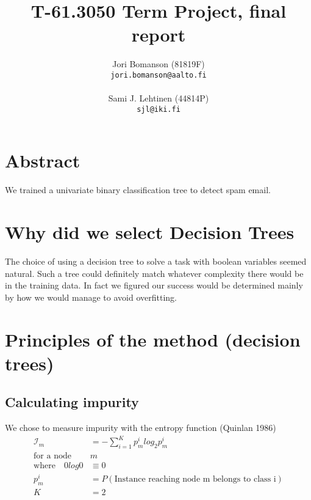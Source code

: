 \documentclass[a4paper,10pt]{article}
\title{T-61.3050 Term Project, final report} %
\author{Jori Bomanson (81819F) \\
  {\tt jori.bomanson@aalto.fi} \\
  \\
  Sami J. Lehtinen (44814P)\\ 
  {\tt sjl@iki.fi} \\
}
\begin{document}

\maketitle

\section*{Abstract}
We trained a univariate binary classification tree to detect spam email.


\section*{}

\section*{Why did we select Decision Trees}

The choice of using a decision tree to solve a task with boolean variables
seemed natural. Such a tree could definitely match whatever complexity there
would be in the training data.
In fact we figured our success would be determined mainly by how we would
manage to avoid overfitting.


\section*{Principles of the method (decision trees)}

\subsection*{Calculating impurity}

We chose to measure impurity  with the entropy function (Quinlan 1986)
\begin{equation*}
\begin{split}
\mathcal{I}_m &= - \sum_{i=1}^K p_m^i log_2 p_m^i  \\
\text{for a node} \quad & m  \\
\text{where} \quad 0 log 0 &\equiv 0  \\
p_m^i &= P(\text{Instance reaching node m belongs to class i})  \\
K &= 2
\end{split}
\end{equation*}
\end{document}
